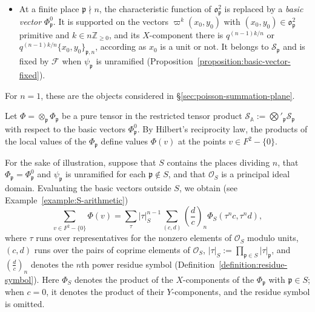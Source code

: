 \documentclass[reqno]{amsart}
\newcommand{\qr}[2]{\left( \frac{#1}{#2} \right)}
\theoremstyle{plain}
\theoremstyle{definition}
\theoremstyle{itplain}
\numberwithin{equation}{section}
\numberwithin{theorem}{section}
\begin{document}
\begin{itemize}
\begin{equation*}
  \end{equation*}
  It is stable under $\widetilde{\mathrm{SL}}_2$ and $\mathcal{F}$ (Theorem~\ref{theorem:schwartz-space}).
\item At a finite place $\mathfrak{p} \nmid n$, the characteristic function of $\mathfrak{o}_{\mathfrak{p}}^2$ is replaced by a \emph{basic vector} $\Phi_{\mathfrak{p}}^0$.  It is supported on the vectors $\varpi^k (x_0, y_0)$ with $(x_0, y_0) \in \mathfrak{o}_{\mathfrak{p}}^2$ primitive and $k \in n \mathbb{Z}_{\geq 0}$, and its $X$-component there is $q^{(n-1) k / n}$ or $q^{(n-1) k / n} \{x_0, y_0\}_{\mathfrak{p}, n}$, according as $x_0$ is a unit or not.  It belongs to $\mathcal{S}_{\mathfrak{p}}$ and is fixed by $\mathcal{F}$ when $\psi_{\mathfrak{p}}$ is unramified (Proposition~\ref{proposition:basic-vector-fixed}).
\end{itemize}
For $n = 1$, these are the objects considered in \S\ref{sec:poisson-summation-plane}.

Let $\Phi = \otimes_{\mathfrak{p}} \Phi_{\mathfrak{p}}$ be a pure tensor in the restricted tensor product $\mathcal{S}_{\mathbb{A}} := \bigotimes'_{\mathfrak{p}} \mathcal{S}_{\mathfrak{p}}$ with respect to the basic vectors $\Phi_{\mathfrak{p}}^0$.  By Hilbert's reciprocity law, the products of the local values of the $\Phi_{\mathfrak{p}}$ define values $\Phi(v)$ at the points $v \in F^2 - \{0\}$.

For the sake of illustration, suppose that $S$ contains the places dividing $n$, that $\Phi_{\mathfrak{p}} = \Phi_{\mathfrak{p}}^0$ and $\psi_{\mathfrak{p}}$ is unramified for each $\mathfrak{p} \notin S$, and that $\mathcal{O}_S$ is a principal ideal domain.  Evaluating the basic vectors outside \(S\), we obtain (see Example~\ref{example:S-arithmetic})
\begin{equation}\label{eq:intro-theta-S}
  \sum_{v \in F^2 - \{0\}} \Phi(v)
  =
  \sum_{\tau} \lvert \tau \rvert_S^{n - 1}
  \sum_{(c, d)} \qr{d}{c}_n \Phi_S(\tau^n c, \tau^n d),
\end{equation}
where $\tau$ runs over representatives for the nonzero elements of $\mathcal{O}_S$ modulo units, $(c, d)$ runs over the pairs of coprime elements of $\mathcal{O}_S$, $\lvert \tau \rvert_S := \prod_{\mathfrak{p} \in S} \lvert \tau \rvert_{\mathfrak{p}}$, and $\qr{d}{c}_n$ denotes the $n$th power residue symbol (Definition~\ref{definition:residue-symbol}).  Here $\Phi_S$ denotes the product of the $X$-components of the $\Phi_{\mathfrak{p}}$ with $\mathfrak{p} \in S$; when $c = 0$, it denotes the product of their $Y$-components, and the residue symbol is omitted.
\end{document}
